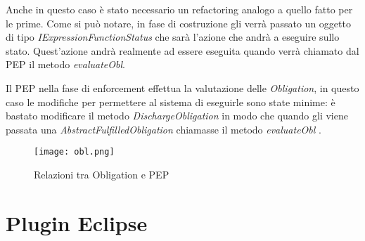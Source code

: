 Anche in questo caso è stato necessario un refactoring analogo a quello fatto per le prime.
Come si può notare, in fase di costruzione gli verrà passato un oggetto di tipo \textit{IExpressionFunctionStatus} che sarà l'azione che andrà a eseguire sullo stato. Quest'azione andrà realmente ad essere eseguita quando verrà chiamato dal \ac{PEP} il metodo \textit{evaluateObl}. \par
Il \ac{PEP} nella fase di enforcement effettua la valutazione delle \textit{Obligation}, in questo caso le modifiche per permettere al sistema di eseguirle sono state minime: è bastato modificare il metodo \textit{DischargeObligation} in modo che quando gli viene passata una \textit{AbstractFulfilledObligation} chiamasse il metodo \textit{evaluateObl} .
\begin{sidewaysfigure}[H]
    \centering
	\texttt{[image: obl.png]}
    \caption{Relazioni tra Obligation e PEP}
    \label{fig:obl.png}
\end{sidewaysfigure}




\section{Plugin Eclipse}
\label{sec:plugin_eclipse}

